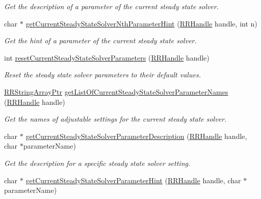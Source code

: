 \begin{DoxyCompactItemize}
\begin{DoxyCompactList}\small\item\em Get the description of a parameter of the current steady state solver. \end{DoxyCompactList}\item 
char $\ast$ \hyperlink{group__simopts_gae77505cd72c88e472c6e6b8f967aa263}{get\+Current\+Steady\+State\+Solver\+Nth\+Parameter\+Hint} (\hyperlink{rrc__types_8h_a1d68f0592372208fa5a5f2799ea4b3ae}{R\+R\+Handle} handle, int n)
\begin{DoxyCompactList}\small\item\em Get the hint of a parameter of the current steady state solver. \end{DoxyCompactList}\item 
int \hyperlink{group__simopts_gafccd26495f4b099700e8f52fdb20794a}{reset\+Current\+Steady\+State\+Solver\+Parameters} (\hyperlink{rrc__types_8h_a1d68f0592372208fa5a5f2799ea4b3ae}{R\+R\+Handle} handle)
\begin{DoxyCompactList}\small\item\em Reset the steady state solver parameters to their default values. \end{DoxyCompactList}\item 
\hyperlink{rrc__types_8h_a7c9475df6c7337d99482b13a365e7596}{R\+R\+String\+Array\+Ptr} \hyperlink{group__simopts_gaab9cc86032339b6275487ca0be59b853}{get\+List\+Of\+Current\+Steady\+State\+Solver\+Parameter\+Names} (\hyperlink{rrc__types_8h_a1d68f0592372208fa5a5f2799ea4b3ae}{R\+R\+Handle} handle)
\begin{DoxyCompactList}\small\item\em Get the names of adjustable settings for the current steady state solver. \end{DoxyCompactList}\item 
char $\ast$ \hyperlink{group__simopts_ga4e00e2cbee01bc5b91c0ae6cfb454b75}{get\+Current\+Steady\+State\+Solver\+Parameter\+Description} (\hyperlink{rrc__types_8h_a1d68f0592372208fa5a5f2799ea4b3ae}{R\+R\+Handle} handle, char $\ast$parameter\+Name)
\begin{DoxyCompactList}\small\item\em Get the description for a specific steady state solver setting. \end{DoxyCompactList}\item 
char $\ast$ \hyperlink{group__simopts_gae754a6adb94adcc4ff2f653f8f10c273}{get\+Current\+Steady\+State\+Solver\+Parameter\+Hint} (\hyperlink{rrc__types_8h_a1d68f0592372208fa5a5f2799ea4b3ae}{R\+R\+Handle} handle, char $\ast$parameter\+Name)

\end{DoxyCompactItemize}
